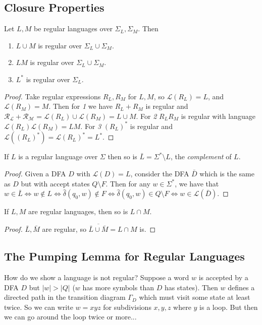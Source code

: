 \documentclass[10pt,a4paper]{article}
\begin{document}
\subsection*{Closure Properties}
\begin{theorem}
Let $L, M$ be regular languages over $\Sigma_L, \Sigma_M$. Then
\begin{enumerate}
\item $L \cup M$ is regular over $\Sigma_L \cup \Sigma_M$.
\item $LM$ is regular over $\Sigma_L \cup \Sigma_M$.
\item $L^{\ast}$ is regular over $\Sigma_L$.
\end{enumerate}
\end{theorem}
\begin{proof}
Take regular expressions $R_L, R_M$ for $L, M$, so $\mathcal{L}(R_L) = L$, and $\mathcal{L}(R_M) = M$. Then for \textit{1} we have $R_L + R_M$ is regular and $\mathcal{R_L + R_M} = \mathcal{L}(R_L)\cup \mathcal{L}(R_M) = L \cup M$. For \textit{2} $R_L R_M$ is regular with language $\mathcal{L}(R_L)\mathcal{L}(R_M) = LM$. For \textit{3} $(R_L)^{\ast}$ is regular and $\mathcal{L}((R_L)^{\ast}) = \mathcal{L}(R_L)^{\ast} = L^{\ast}.$
\end{proof}

\begin{theorem}
If $L$ is a regular language over $\Sigma$ then so is $\bar{L} = \Sigma^{\ast} \setminus L$, the \emph{complement} of $L$.
\end{theorem}
\begin{proof}
Given a DFA $D$ with $\mathcal{L}(D) = L$, consider the DFA $\bar{D}$ which is the same as $D$ but with accept states $Q \setminus F$. Then for any $w \in \Sigma^{\ast}$, we have that $w \in \bar{L} \iff w \notin L \iff \hat{\delta}(q_0, w) \notin F \iff \hat{\delta}(q_0, w) \in Q \setminus F \iff w \in \mathcal{L}(\bar{D})$.
\end{proof}
\begin{theorem}
If $L,M$ are regular languages, then so is $L \cap M$.
\end{theorem}
\begin{proof}
$\bar{L}, \bar{M}$ are regular, so $\overline{\bar{L} \cup \bar{M}} = L \cap M$ is.
\end{proof}
\subsection*{The Pumping Lemma for Regular Languages}
How do we show a language is not regular? Suppose a word $w$ is accepted by a DFA $D$ but $|w| > |Q|$ ($w$ has more symbols than $D$ has states). Then $w$ defines a directed path in the transition diagram $\Gamma_D$ which must visit some state at least twice. So we can write $w = xyz$ for subdivisions $x,y,z$ where $y$ is a loop. But then we can go around the loop twice or more...
\end{document}
